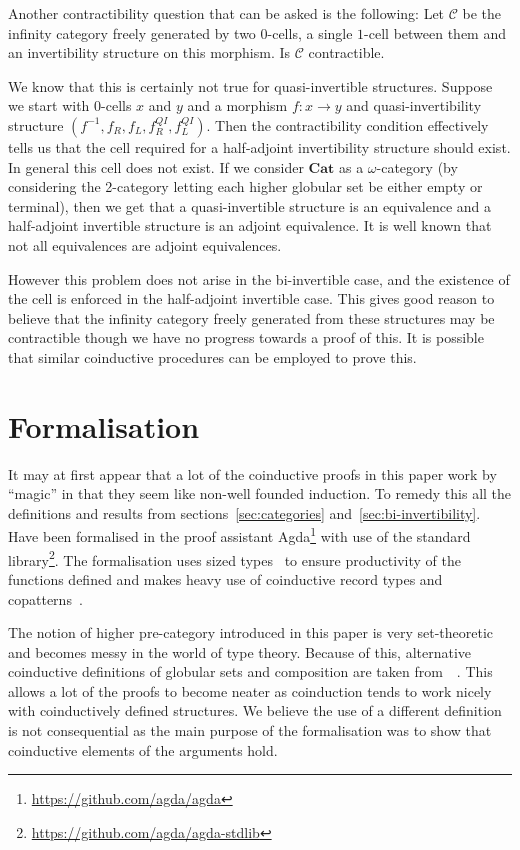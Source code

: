 \documentclass[draft]{article}
\theoremstyle{definition} \newtheorem{definition}{Definition}
\theoremstyle{remark} \newtheorem{remark}{Remark}
\newcommand{\inv}[1]{#1^{-1}} \newcommand{\comp}{\star}
\begin{document}
Another contractibility question that can be asked is the following:
Let \(\mathcal{C}\) be the infinity category freely generated by two
\(0\)-cells, a single \(1\)-cell between them and an invertibility
structure on this morphism. Is \(\mathcal{C}\) contractible.

We know that this is certainly not true for quasi-invertible
structures. Suppose we start with \(0\)-cells \(x\) and \(y\) and a
morphism \(f : x \to y\) and quasi-invertibility structure \((\inv f,
f_R, f_L, f_R^{QI}, f_L^{QI})\). Then the contractibility condition
effectively tells us that the cell required for a half-adjoint
invertibility structure should exist. In general this cell does not
exist. If we consider \(\mathbf{Cat}\) as a \(\omega\)-category (by
considering the 2-category letting each higher globular set be either
empty or terminal), then we get that a quasi-invertible structure is
an equivalence and a half-adjoint invertible structure is an adjoint
equivalence. It is well known that not all equivalences are adjoint
equivalences.

However this problem does not arise in the bi-invertible case, and the
existence of the cell is enforced in the half-adjoint invertible case.
This gives good reason to believe that the infinity category freely
generated from these structures may be contractible though we have no
progress towards a proof of this. It is possible that similar
coinductive procedures can be employed to prove this.

\section{Formalisation}\label{sec:formalisation}

It may at first appear that a lot of the coinductive proofs in this
paper work by ``magic'' in that they seem like non-well founded
induction. To remedy this all the definitions and results from
sections~\ref{sec:categories} and~\ref{sec:bi-invertibility}. Have
been formalised in the proof assistant
Agda\footnote{\url{https://github.com/agda/agda}} with use of the
standard library\footnote{\url{https://github.com/agda/agda-stdlib}}.
The formalisation uses sized types~\cite{Abel_2010} to ensure
productivity of the functions defined and makes heavy use of
coinductive record types and
copatterns~\cite{10.1145/2480359.2429075}.

The notion of higher pre-category introduced in this paper is very
set-theoretic and becomes messy in the world of type theory. Because
of this, alternative coinductive definitions of globular sets and
composition are taken
from~~\cite{hirschowitz_et_al:LIPIcs:2015:5166}.
This allows a lot of the proofs to become neater as coinduction tends
to work nicely with coinductively defined structures. We believe the
use of a different definition is not consequential as the main purpose
of the formalisation was to show that coinductive elements of the
arguments hold.
\end{document}
